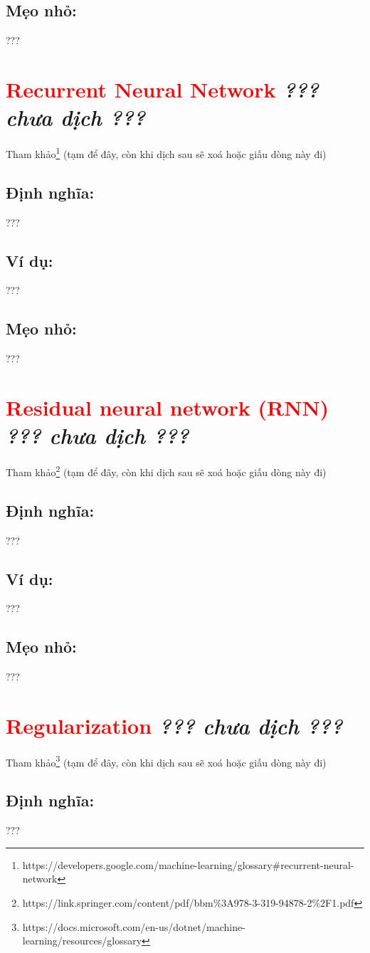 \subsection*{Mẹo nhỏ:}
???
\section*{\huge \textcolor{Red}{Recurrent Neural Network}  \small \textit{??? chưa dịch ???} }
Tham khảo\footnote{https://developers.google.com/machine-learning/glossary\#recurrent-neural-network} (tạm để đây, còn khi dịch sau sẽ xoá hoặc giấu dòng này đi)
\subsection*{Định nghĩa:}
???
\subsection*{Ví dụ:}
???
\subsection*{Mẹo nhỏ:}
???
\section*{\huge \textcolor{Red}{Residual neural network (RNN)}  \small \textit{??? chưa dịch ???} }
Tham khảo\footnote{https://link.springer.com/content/pdf/bbm\%3A978-3-319-94878-2\%2F1.pdf} (tạm để đây, còn khi dịch sau sẽ xoá hoặc giấu dòng này đi)
\subsection*{Định nghĩa:}
???
\subsection*{Ví dụ:}
???
\subsection*{Mẹo nhỏ:}
???
\section*{\huge \textcolor{Red}{Regularization}  \small \textit{??? chưa dịch ???} }
Tham khảo\footnote{https://docs.microsoft.com/en-us/dotnet/machine-learning/resources/glossary} (tạm để đây, còn khi dịch sau sẽ xoá hoặc giấu dòng này đi)
\subsection*{Định nghĩa:}
???
